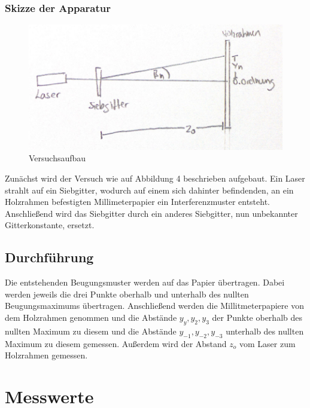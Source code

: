 \documentclass[12pt,a4paper,titlepage,headinclude,bibtotoc]{scrartcl}
\begin{document}
\subsubsection{Skizze der Apparatur}
\begin{figure} [h!]
\begin{center}
\includegraphics[scale=1]{Aufbau.png} \end{center}
\caption{Versuchsaufbau}
\end{figure}

Zunächst wird der Versuch wie auf Abbildung 4 beschrieben aufgebaut.
Ein Laser strahlt auf ein Siebgitter, wodurch auf einem sich dahinter befindenden, an ein Holzrahmen befestigten Millimeterpapier ein Interferenzmuster entsteht. Anschließend wird das Siebgitter durch ein anderes Siebgitter, nun unbekannter Gitterkonstante, ersetzt.


\subsection{Durchführung}
Die entstehenden Beugungsmuster werden auf das Papier übertragen. Dabei werden jeweils die drei Punkte  oberhalb und unterhalb des nullten Beugungsmaximums übertragen.
Anschließend werden die Millitmeterpapiere von dem Holzrahmen genommen und die Abstände $y_{y},y_{2},y_{3}$ der Punkte oberhalb des nullten Maximum zu diesem und die Abstände $y_{-1},y_{-2},y_{-3}$ unterhalb des nullten Maximum zu diesem gemessen. Außerdem wird der Abstand $z_{o}$ vom Laser zum Holzrahmen gemessen.


\section{Messwerte}

\end{document}
